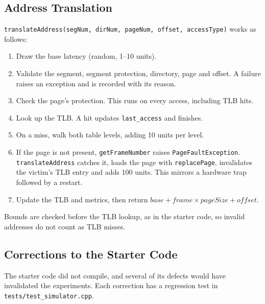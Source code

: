\documentclass[11pt]{article}
\newcommand{\code}[1]{\texttt{#1}}
\begin{document}
\subsection{Address Translation}
\code{translateAddress(segNum, dirNum, pageNum, offset, accessType)} works as follows:
\begin{enumerate}
  \item Draw the base latency (random, 1--10 units).
  \item Validate the segment, segment protection, directory, page and offset.
        A failure raises an exception and is recorded with its reason.
  \item Check the page's protection. This runs on every access, including TLB hits.
  \item Look up the TLB. A hit updates \code{last\_access} and finishes.
  \item On a miss, walk both table levels, adding 10 units per level.
  \item If the page is not present, \code{getFrameNumber} raises
        \code{PageFaultException}. \code{translateAddress} catches it, loads the
        page with \code{replacePage}, invalidates the victim's TLB entry and adds
        100 units. This mirrors a hardware trap followed by a restart.
  \item Update the TLB and metrics, then return
        $\mathit{base} + \mathit{frame} \times \mathit{pageSize} + \mathit{offset}$.
\end{enumerate}
Bounds are checked before the TLB lookup, as in the starter code, so invalid
addresses do not count as TLB misses.

\subsection{Corrections to the Starter Code}
The starter code did not compile, and several of its defects would have
invalidated the experiments. Each correction has a regression test in
\code{tests/test\_simulator.cpp}.
\end{document}
